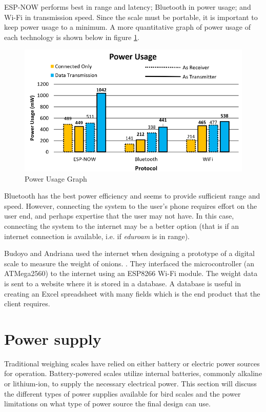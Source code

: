 \documentclass[class=report,11pt,crop=false]{standalone}
\begin{document}
ESP-NOW performs best in range and latency; Bluetooth in power usage; and Wi-Fi in transmission speed. Since the scale must be portable, it is important to keep power usage to a minimum. 
A more quantitative graph of power usage of each technology is shown below in figure \ref{fig:power-usage}.

\begin{figure}[h!]
	\centering
	\includegraphics[scale=0.7]{"Figures/Power usage"}
	\caption{Power Usage Graph}
	\label{fig:power-usage}
\end{figure}

Bluetooth has the best power efficiency and seems to provide sufficient range and speed.
However, connecting the system to the user's phone requires effort on the user end, and perhaps expertise that the user may not have. In this case, connecting the system to the internet may be a better option (that is if an internet connection is available, i.e. if \textit{eduroam} is in range). 

Budoyo and Andriana used the internet when designing a prototype of a digital scale to measure the weight of onions. \cite{iot}. They interfaced the microcontroller (an  ATMega2560) to the internet using an ESP8266 Wi-Fi module. The weight data is sent to a website where it is stored in a database. A database is useful in creating an Excel spreadsheet with many fields which is the end product that the client requires.

\section{Power supply}	
Traditional weighing scales have relied on either battery or electric power sources for operation. Battery-powered scales utilize internal batteries, commonly alkaline or lithium-ion, to supply the necessary electrical power. This section will discuss the different types of power supplies available for bird scales and the power limitations on what type of power source the final design can use.
\end{document}
